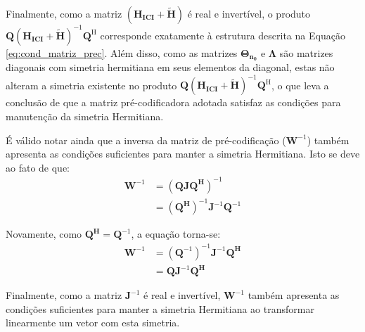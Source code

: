 Finalmente, como a matriz $\left( \mathbf{ H_\text{ICI}} + \tilde{\mathbf{H}} \right)$ é real e invertível, o produto $\mathbf{Q} \left( \mathbf{ H_\text{ICI}} + \tilde{\mathbf{H}} \right)^{-1} \mathbf{Q}^{\text{H}}$ corresponde exatamente à estrutura descrita na Equação \ref{eq:cond_matriz_prec}. Além disso, como as matrizes $\mathbf{\Theta_{n_0}}$ e $\mathbf{\Lambda}$ são matrizes diagonais com simetria hermitiana em seus elementos da diagonal, estas não alteram a simetria existente no produto $\mathbf{Q} \left( \mathbf{ H_\text{ICI}} + \tilde{\mathbf{H}} \right)^{-1} \mathbf{Q}^{\text{H}}$, o que leva a conclusão de que a matriz pré-codificadora adotada satisfaz as condições para manutenção da simetria Hermitiana.


É válido notar ainda que a inversa da matriz de pré-codificação ($\mathbf{W}^{-1}$) também apresenta as condições suficientes para manter a simetria Hermitiana. Isto se deve ao fato de que:
\begin{align}
\mathbf{W}^{-1} &= \mathbf{\left(Q J Q^{H}\right)}^{-1}\\
 &= \mathbf{\left(Q^{H}\right)}^{-1} \mathbf{J}^{-1} \mathbf{Q}^{-1} 
\end{align}

Novamente, como $\mathbf{Q^{H}} = \mathbf{Q}^{-1}$, a equação torna-se:
\begin{align}
\mathbf{W}^{-1} &= \left(\mathbf{Q}^{-1}\right)^{-1} \mathbf{J}^{-1} \mathbf{Q^{H}}\\
&= \mathbf{Q} \mathbf{J}^{-1} \mathbf{Q^{H}}
\end{align}

Finalmente, como a matriz $\mathbf{J}^{-1}$ é real e invertível, $\mathbf{W}^{-1}$ também apresenta as condições suficientes para manter a simetria Hermitiana ao transformar linearmente um vetor com esta simetria.